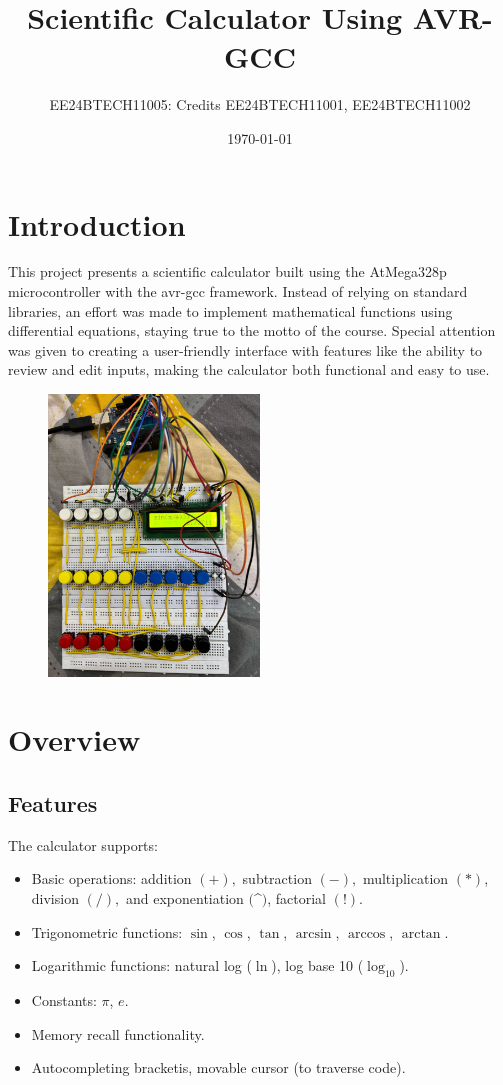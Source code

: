 \documentclass[a4paper,12pt]{article}
\title{Scientific Calculator Using AVR-GCC}
\author{EE24BTECH11005: Credits EE24BTECH11001, EE24BTECH11002}
\date{\today}
\begin{document}
\maketitle

\section*{Introduction}
This project presents a scientific calculator built using the AtMega328p microcontroller with the avr-gcc framework. Instead of relying on standard libraries, an effort was made to implement mathematical functions using differential equations, staying true to the motto of the course. Special attention was given to creating a user-friendly interface with features like the ability to review and edit inputs, making the calculator both functional and easy to use.
\begin{figure}[h!]
  \begin{center}
    \includegraphics[width=0.5\textwidth]{figs/circuit.png}
  \end{center}
  \caption{}
  \label{fig:Circuit}
\end{figure}
\pagebreak
\section*{Overview}
\subsection*{Features}
The calculator supports:
\begin{itemize}
    \item Basic operations: addition $(+),$ subtraction $(-),$ multiplication $(*)$, division $(/),$ and exponentiation $($\textasciicircum$)$, factorial $(!)$.
    \item Trigonometric functions: $\sin$, $\cos$, $\tan$, $\arcsin$, $\arccos$, $\arctan$.
    \item Logarithmic functions: natural log ($\ln$), log base 10 ($\log_{10}$).
    \item Constants: $\pi$, $e$.
    \item Memory recall functionality.
    \item Autocompleting bracketis, movable cursor (to traverse code).
\end{itemize}
\end{document}
